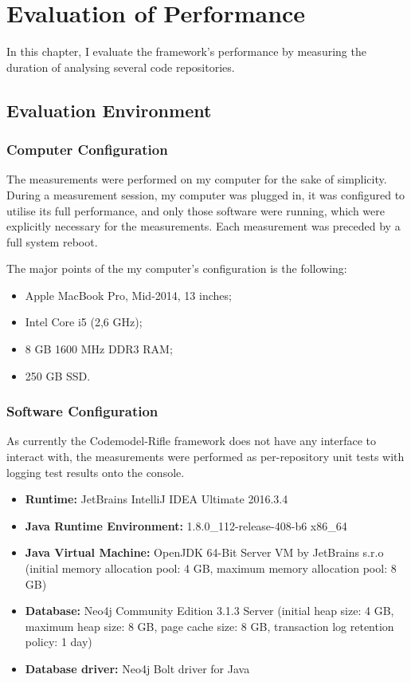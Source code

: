\chapter{Evaluation of Performance}
\label{chapter:evaluation}

In this chapter, I evaluate the framework's performance by measuring the duration of analysing several code repositories.


\section{Evaluation Environment}

\subsection{Computer Configuration}

The measurements were performed on my computer for the sake of simplicity. During a measurement session, my computer was plugged in, it was configured to utilise its full performance, and only those software were running, which were explicitly necessary for the measurements. Each measurement was preceded by a full system reboot.

The major points of the my computer's configuration is the following:

\begin{itemize}
\item Apple MacBook Pro, Mid-2014, 13 inches;
\item Intel Core i5 (2,6 GHz);
\item 8 GB 1600 MHz DDR3 RAM;
\item 250 GB SSD.
\end{itemize}


\subsection{Software Configuration}

As currently the Codemodel-Rifle framework does not have any interface to interact with, the measurements were performed as per-repository unit tests with logging test results onto the console.

\begin{itemize}
\item \textbf{Runtime:} JetBrains IntelliJ IDEA Ultimate 2016.3.4
\item \textbf{Java Runtime Environment:} 1.8.0\_112-release-408-b6 x86\_64
\item \textbf{Java Virtual Machine:} OpenJDK 64-Bit Server VM by JetBrains s.r.o (initial memory allocation pool: 4 GB, maximum memory allocation pool: 8 GB)
\item \textbf{Database:} Neo4j Community Edition 3.1.3 Server (initial heap size: 4 GB, maximum heap size: 8 GB, page cache size: 8 GB, transaction log retention policy: 1 day)
\item \textbf{Database driver:} Neo4j Bolt driver for Java
\end{itemize}

